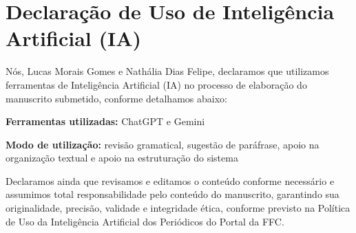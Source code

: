 \chapter{Declaração de Uso de Inteligência Artificial (IA)}
\label{cap:declaracao-ia}

Nós, Lucas Morais Gomes e Nathália Dias Felipe, declaramos que utilizamos ferramentas de Inteligência Artificial (IA) no processo de elaboração do manuscrito submetido, conforme detalhamos abaixo:

\noindent\textbf{Ferramentas utilizadas:} ChatGPT e Gemini

\noindent\textbf{Modo de utilização:} revisão gramatical, sugestão de paráfrase, apoio na organização textual e apoio na estruturação do sistema

Declaramos ainda que revisamos e editamos o conteúdo conforme necessário e assumimos total responsabilidade pelo conteúdo do manuscrito, garantindo sua originalidade, precisão, validade e integridade ética, conforme previsto na Política de Uso da Inteligência Artificial dos Periódicos do Portal da FFC.
